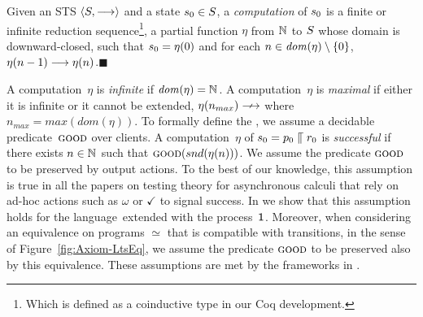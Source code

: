 \begin{definition}[Computation]
  Given an STS $\langle  S ,  \mathrel{\overset{}\longrightarrow}  \rangle$ and a state
  $s_0 \in S$, a %
  \emph{computation} of $s_0$ is a finite or infinite
  reduction sequence\footnote{Which is defined as a coinductive
    type in our Coq development.}, \ie a partial function $\eta$ from
  $\mathbb{N}_{}$ to $S$ whose domain is downward-closed, such that
  $s_0 = \eta(0)$
and %
for each
$n \in \mathit{dom}(\eta) \setminus \{0\}$, $\eta(n-1) \mathrel{\overset{ }\longrightarrow} \eta(n)$.\hfill$\blacksquare$
\end{definition}

A computation~$\eta$ is
{\em infinite} if $ \mathit{dom}(\eta) = \mathbb{N}_{}$. A computation~$\eta$ is
{\em maximal} if
either it is infinite or it cannot be extended,
\ie $\eta(n_{max}) \Nst{}$ where $n_{max} = max( \mathit{dom}(\eta))$.
To formally define the \mustpreorder, we assume a decidable
predicate~$\textsc{good}$ over clients.
A computation~$\eta$ of $s_0 =
p_0 \mathrel{\llceil} r_0$
is {\em successful} if there exists $ n \in \mathbb{N}_{} $ such that
$\good{ \mathsf{snd}(\eta(n)) }$.  We assume the predicate $\textsc{good}$
to be preserved by output actions.  To the best of our knowledge, this
assumption is true in all the papers on testing theory for
asynchronous calculi that rely on ad-hoc actions such as $\omega$ or
$\checkmark$ to signal success.  In  we show that this
assumption holds for the language~\ACCS extended with the
process~$\mathop{\textsf{1}}$.
%
Moreover, when considering an equivalence on programs $\simeq$ that is
compatible with transitions, in the sense of Figure~\ref{fig:Axiom-LtsEq}, we
assume the predicate $\textsc{good}$ to be preserved also by this equivalence.
%
These assumptions are met by the frameworks in
  \cite{DBLP:conf/fsttcs/CastellaniH98,DBLP:journals/iandc/BorealeNP02,DBLP:journals/jlp/Hennessy05}.


